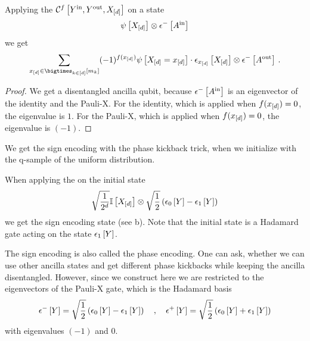 \begin{lemma}\label{lem:phaseKick}
    Applying the \computationCircuit{} $\mathcal{C}^{f}\left[Y^{\mathrm{in}},Y^{\mathrm{out}},X_{[d]}\right]$ on a state
    \begin{align*}
        \psi\left[X_{[d]}\right] \otimes \epsilon^{-}\left[A^{\mathrm{in}}\right]
    \end{align*}
    we get
    \begin{align*}
        \sum_{\shortcatindicesin} (-1)^{\formula(\shortcatindices)} \qstateat{\indexedshortcatvariables}\cdot \onehotmapofat{\shortcatindices}{\shortcatvariables}
        \otimes \hminusbasat{\cavariable{\outsymbol}} \, .
    \end{align*}
\end{lemma}
\begin{proof}
    We get a disentangled ancilla qubit, because $\epsilon^{-}\left[A^{\mathrm{in}}\right]$ is an eigenvector of the identity and the Pauli-X.
    For the identity, which is applied when $f(x_{[d]})=0$, the eigenvalue is $1$.
    For the Pauli-X, which is applied when $f(x_{[d]})=0$, the eigenvalue is $(-1)$.
\end{proof}

We get the sign encoding with the phase kickback trick, when we initialize with the q-sample of the uniform distribution.

\begin{corollary}%
    When applying the \computationCircuit{} on the initial state
    \begin{align*}
        \sqrt{\frac{1}{2^d}}\mathbb{I}\left[X_{[d]}\right]
        \otimes \sqrt{\frac{1}{2}} \left(\epsilon_{0}\left[Y\right] - \epsilon_{1}\left[Y\right]\right)
    \end{align*}
    we get the sign encoding state (see b).
    Note that the initial state is a Hadamard gate acting on the state $\epsilon_{1}\left[Y\right]$.
\end{corollary}

The sign encoding is also called the phase encoding.
One can ask, whether we can use other ancilla states and get different phase kickbacks while keeping the ancilla disentangled.
However, since we construct here \computationCircuit{} we are restricted to the eigenvectors of the Pauli-X gate, which is the Hadamard basis
\begin{align*}
    \epsilon^{-}\left[Y\right]
    = \sqrt{\frac{1}{2}} \left(\epsilon_{0}\left[Y\right] - \epsilon_{1}\left[Y\right]\right) \quad,\quad
    \epsilon^{+}\left[Y\right]
    =\sqrt{\frac{1}{2}} \left(\epsilon_{0}\left[Y\right] + \epsilon_{1}\left[Y\right]\right)
\end{align*}
with eigenvalues $(-1)$ and $0$.


